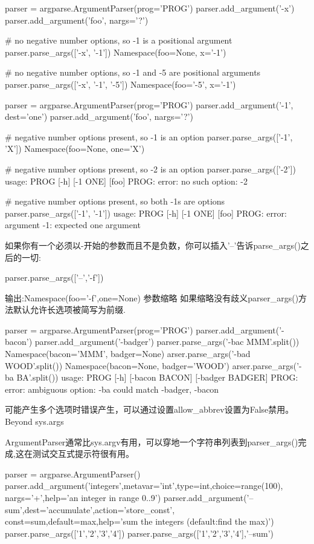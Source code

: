 \begin{python}
parser = argparse.ArgumentParser(prog='PROG')
parser.add_argument('-x')
parser.add_argument('foo', nargs='?')

# no negative number options, so -1 is a positional argument
parser.parse_args(['-x', '-1'])
Namespace(foo=None, x='-1')

# no negative number options, so -1 and -5 are positional arguments
parser.parse_args(['-x', '-1', '-5'])
Namespace(foo='-5', x='-1')

parser = argparse.ArgumentParser(prog='PROG')
parser.add_argument('-1', dest='one')
parser.add_argument('foo', nargs='?')

# negative number options present, so -1 is an option
parser.parse_args(['-1', 'X'])
Namespace(foo=None, one='X')

# negative number options present, so -2 is an option
parser.parse_args(['-2'])
usage: PROG [-h] [-1 ONE] [foo]
PROG: error: no such option: -2

# negative number options present, so both -1s are options
parser.parse_args(['-1', '-1'])
usage: PROG [-h] [-1 ONE] [foo]
PROG: error: argument -1: expected one argument
\end{python}
如果你有一个必须以-开始的参数而且不是负数，你可以插入'--'告诉parse\_args()之后的一切:
\begin{python}
parser.parse_args(['--','-f'])
\end{python}
输出:Namespace(foo='-f',one=None)
参数缩略
如果缩略没有歧义parser\_args()方法默认允许长选项被简写为前缀.
\begin{python}
parser = argparse.ArgumentParser(prog='PROG')
parser.add_argument('-bacon')
parser.add_argument('-badger')
parser.parse_args('-bac MMM'.split())
Namespace(bacon='MMM', badger=None)
arser.parse_args('-bad WOOD'.split())
Namespace(bacon=None, badger='WOOD')
arser.parse_args('-ba BA'.split())
usage: PROG [-h] [-bacon BACON] [-badger BADGER]
PROG: error: ambiguous option: -ba could match -badger, -bacon
\end{python}
可能产生多个选项时错误产生，可以通过设置allow\_abbrev设置为False禁用。
Beyond sys.args\par
ArgumentParser通常比sys.argv有用，可以穿地一个字符串列表到parser\_args()完成,这在测试交互式提示符很有用。
\begin{python}
parser = argparse.ArgumentParser()
parser.add_argument('integers',metavar='int',type=int,choice=range(100),
nargs='+',help='an integer in range 0..9')
parser.add_argument('--sum',dest='accumulate',action='store_const',
const=sum,default=max,help='sum the integers (default:find the max)')
parser.parse_args(['1','2','3','4'])
parser.parse_args(['1','2','3','4'],'--sum')
\end{python}
